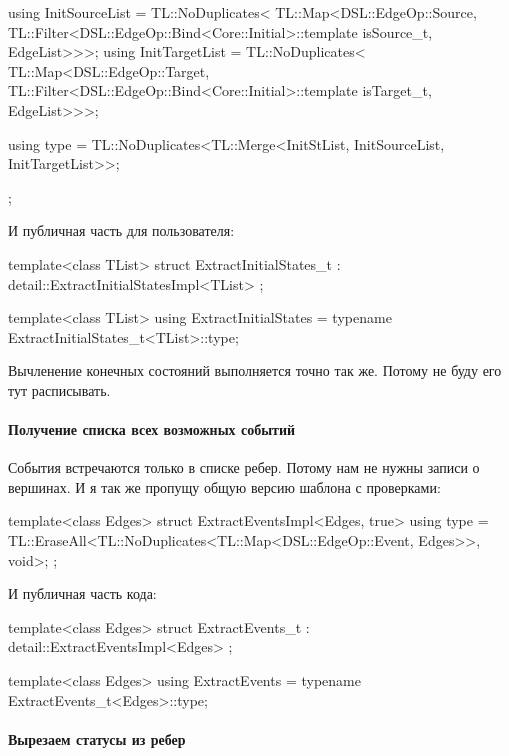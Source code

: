 \documentclass{article}
\begin{document}
{\begin{cppcode}
{  using InitSourceList = TL::NoDuplicates<
      TL::Map<DSL::EdgeOp::Source,
              TL::Filter<DSL::EdgeOp::Bind<Core::Initial>::template isSource_t,
                         EdgeList>>>;
  using InitTargetList = TL::NoDuplicates<
      TL::Map<DSL::EdgeOp::Target,
              TL::Filter<DSL::EdgeOp::Bind<Core::Initial>::template isTarget_t,
                         EdgeList>>>;

  using type =
      TL::NoDuplicates<TL::Merge<InitStList, InitSourceList, InitTargetList>>;
};
\end{cppcode}
И публичная часть для пользователя:
\begin{cppcode}
template<class TList>
struct ExtractInitialStates_t : detail::ExtractInitialStatesImpl<TList> {};

template<class TList>
using ExtractInitialStates = typename ExtractInitialStates_t<TList>::type;
\end{cppcode}
Вычленение конечных состояний выполняется точно так же.
Потому не буду его тут расписывать.

\paragraph{Получение списка всех возможных событий}

События встречаются только в списке ребер.
Потому нам не нужны записи о вершинах.
И я так же пропущу общую версию шаблона с проверками:
\begin{cppcode}
template<class Edges>
struct ExtractEventsImpl<Edges, true> {
  using type =
      TL::EraseAll<TL::NoDuplicates<TL::Map<DSL::EdgeOp::Event, Edges>>, void>;
};
\end{cppcode}
И публичная часть кода:
\begin{cppcode}
template<class Edges>
struct ExtractEvents_t : detail::ExtractEventsImpl<Edges> {};

template<class Edges>
using ExtractEvents = typename ExtractEvents_t<Edges>::type;
\end{cppcode}

\paragraph{Вырезаем статусы из ребер}

}
\end{document}
